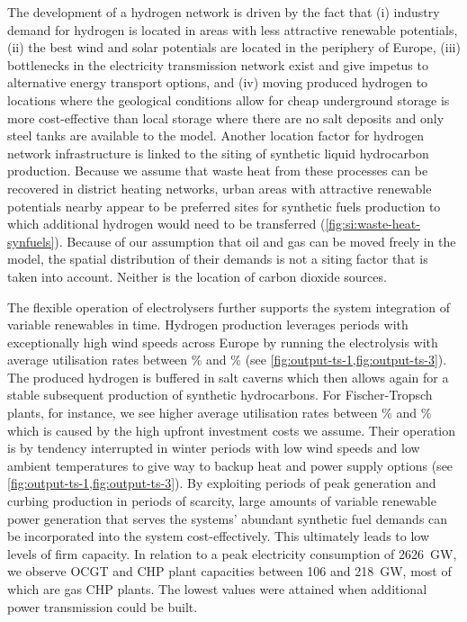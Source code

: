 The development of a hydrogen network is driven by the fact that (i) industry
demand for hydrogen is located in areas with less attractive renewable
potentials, (ii) the best wind and solar potentials are located in the periphery
of Europe, (iii) bottlenecks in the electricity transmission network exist and
give impetus to alternative energy transport options, and (iv) moving produced
hydrogen to locations where the geological conditions allow for cheap
underground storage is more cost-effective than local storage where there are no
salt deposits and only steel tanks are available to the model. Another location
factor for hydrogen network infrastructure is linked to the siting of synthetic
liquid hydrocarbon production. Because we assume that waste heat from these
processes can be recovered in district heating networks, urban areas with
attractive renewable potentials nearby appear to be preferred sites for
synthetic fuels production to which additional hydrogen would need to be
transferred (\cref{fig:si:waste-heat-synfuels}). Because of our assumption that
oil and gas can be moved freely in the model, the spatial distribution of their
demands is not a siting factor that is taken into account. Neither is the
location of carbon dioxide sources.

The flexible operation of electrolysers further supports the system integration
of variable renewables in time. Hydrogen production leverages periods with
exceptionally high wind speeds across Europe by running the electrolysis with
average utilisation rates between \mincfelectrolysis\% and \maxcfelectrolysis\%
(see \cref{fig:output-ts-1,fig:output-ts-3}). The produced hydrogen is buffered
in salt caverns which then allows again for a stable subsequent production of
synthetic hydrocarbons. For Fischer-Tropsch plants, for instance, we see higher
average utilisation rates between \mincfFT\% and \maxcfFT\% which is caused by the high upfront
investment costs we assume. Their operation is by tendency interrupted in winter
periods with low wind speeds and low ambient temperatures to give way to backup
heat and power supply options (see \cref{fig:output-ts-1,fig:output-ts-3}). By
exploiting periods of peak generation and curbing production in periods of
scarcity, large amounts of variable renewable power generation that serves the
systems' abundant synthetic fuel demands can be incorporated into the system
cost-effectively. This ultimately leads to low levels of firm capacity. In
relation to a peak electricity consumption of 2626~GW\el, we observe OCGT and
CHP plant capacities between 106 and 218~GW\el, most of which are gas CHP plants.
The lowest values were attained when additional power transmission could be
built.

